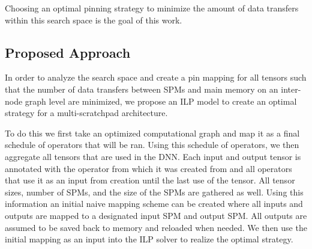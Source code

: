 Choosing an optimal pinning strategy to minimize the amount of data transfers
within this search space is the goal of this work.

\subsection{Proposed Approach}
In order to analyze the search space and create a pin mapping for all tensors
such that the number of data transfers between SPMs and main memory on an
inter-node graph level are minimized, we propose an ILP model to create an
optimal strategy for a multi-scratchpad architecture.

To do this we first take an optimized computational graph and map it as a final
schedule of operators that will be ran. Using this schedule of operators, we
then aggregate all tensors that are used in the DNN. Each input and output
tensor is annotated with the operator from which it was created from and all
operators that use it as an input from creation until the last use of the
tensor. All tensor sizes, number of SPMs, and the size of the SPMs are gathered
as well. Using this information an initial naive mapping scheme can be created
where all inputs and outputs are mapped to a designated input SPM and output
SPM. All outputs are assumed to be saved back to memory and reloaded when
needed. We then use the initial mapping as an input into the ILP solver to realize the
optimal strategy.
